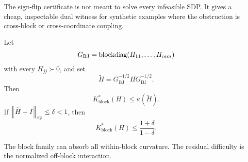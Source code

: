The sign-flip certificate is not meant to solve every infeasible SDP. It gives
a cheap, inspectable dual witness for synthetic examples where the obstruction
is cross-block or cross-coordinate coupling.

\begin{proposition}
\label{prop:block-jacobi}
Let
\[
  G_{\mathrm{BJ}}=\operatorname{blockdiag}(H_{11},\ldots,H_{mm})
\]
with every \(H_{jj}\succ0\), and set
\[
  \widetilde H=G_{\mathrm{BJ}}^{-1/2}HG_{\mathrm{BJ}}^{-1/2}.
\]
Then
\[
  K_{\mathrm{block}}^\ast(H)\le \kappa(\widetilde H).
\]
If \(\left\lVert \widetilde H-I\right\rVert_{\operatorname{op}}\le\delta<1\), then
\[
  K_{\mathrm{block}}^\ast(H)\le\frac{1+\delta}{1-\delta}.
\]
\end{proposition}

The block family can absorb all within-block curvature. The residual
difficulty is the normalized off-block interaction.
